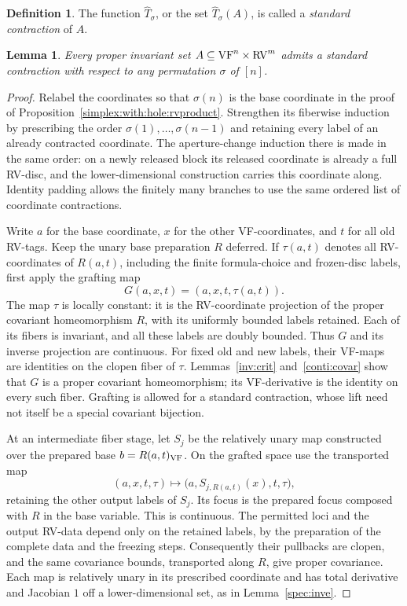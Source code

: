 \documentclass[12pt]{amsart}
\newcommand{\memph}[1]{{\color{magenta}\emph{#1}}}
\theoremstyle{plain}
\newtheorem{lem}[thm]{Lemma}
\theoremstyle{definition}
\newtheorem{defn}[thm]{Definition}
\theoremstyle{remark}
\numberwithin{equation}{section}
\theoremstyle{plain}
\newcommand{\VF}{\textup{VF}}
\newcommand{\RV}{\textup{RV}}
\newcommand{\0}{\emptyset}
\newcommand{\sub}{\subseteq}
\begin{document}
\begin{defn}\label{defn:standard:contraction}
The function $\hat T_{\sigma}$, or the set $\hat T_{\sigma}(A)$, is called a \memph{standard contraction} of  $A$.
\end{defn}



\begin{lem}\label{exit:stand}
Every proper invariant set $A \sub \VF^{n} \times \RV^{m}$  admits a standard contraction with respect to any permutation $\sigma$ of $[n]$.
\end{lem}
\begin{proof}
Relabel the coordinates so that $\sigma(n)$ is the base coordinate in the proof of Proposition~\ref{simplex:with:hole:rvproduct}. Strengthen its fiberwise induction by prescribing the order $\sigma(1),\ldots,\sigma(n-1)$ and retaining every label of an already contracted coordinate. The aperture-change induction there is made in the same order: on a newly released block its released coordinate is already a full RV-disc, and the lower-dimensional construction carries this coordinate along. Identity padding allows the finitely many branches to use the same ordered list of coordinate contractions.

Write $a$ for the base coordinate, $x$ for the other VF-coordinates, and $t$ for all old RV-tags. Keep the unary base preparation $R$ deferred. If $\tau(a,t)$ denotes all RV-coordinates of $R(a,t)$, including the finite formula-choice and frozen-disc labels, first apply the grafting map
\[
G(a,x,t)=(a,x,t,\tau(a,t)).
\]
The map $\tau$ is locally constant: it is the RV-coordinate projection of the proper covariant homeomorphism $R$, with its uniformly bounded labels retained. Each of its fibers is invariant, and all these labels are doubly bounded. Thus $G$ and its inverse projection are continuous. For fixed old and new labels, their VF-maps are identities on the clopen fiber of $\tau$. Lemmas~\ref{inv:crit} and~\ref{conti:covar} show that $G$ is a proper covariant homeomorphism; its VF-derivative is the identity on every such fiber. Grafting is allowed for a standard contraction, whose lift need not itself be a special covariant bijection.

At an intermediate fiber stage, let $S_j$ be the relatively unary map constructed over the prepared base $b=R(a,t)_{\VF}$. On the grafted space use the transported map
\[
(a,x,t,\tau)\longmapsto
\bigl(a,S_{j,R(a,t)}(x),t,\tau\bigr),
\]
retaining the other output labels of $S_j$. Its focus is the prepared focus composed with $R$ in the base variable. This is continuous. The permitted loci and the output RV-data depend only on the retained labels, by the preparation of the complete data and the freezing steps. Consequently their pullbacks are clopen, and the same covariance bounds, transported along $R$, give proper covariance. Each map is relatively unary in its prescribed coordinate and has total derivative and Jacobian $1$ off a lower-dimensional set, as in Lemma~\ref{spec:inve}.


\end{proof}
\end{document}
